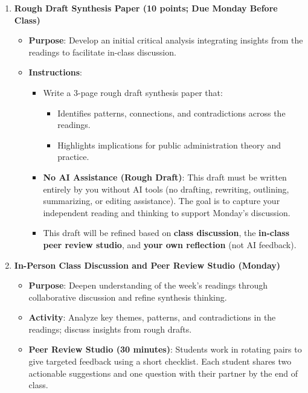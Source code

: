 \documentclass[11pt]{article}     %
\begin{document}
\begin{enumerate}
    \item \textbf{Rough Draft Synthesis Paper (10 points; Due Monday Before Class)}
    \begin{itemize}
        \item \textbf{Purpose}: Develop an initial critical analysis integrating insights from the readings to facilitate in-class discussion.
        \item \textbf{Instructions}:
        \begin{itemize}
            \item Write a 3-page rough draft synthesis paper that:
            \begin{itemize}
                \item Identifies patterns, connections, and contradictions across the readings.
                \item Highlights implications for public administration theory and practice.
            \end{itemize}
    
            \item \textbf{No AI Assistance (Rough Draft)}: This draft must be written entirely by you without AI tools (no drafting, rewriting, outlining, summarizing, or editing assistance). The goal is to capture your independent reading and thinking to support Monday’s discussion.
    
            \item This draft will be refined based on \textbf{class discussion}, the \textbf{in-class peer review studio}, and \textbf{your own reflection} (not AI feedback).
        \end{itemize}
    \end{itemize}

    \item \textbf{In-Person Class Discussion and Peer Review Studio (Monday)}
        \begin{itemize}
            \item \textbf{Purpose}: Deepen understanding of the week's readings through collaborative discussion and refine synthesis thinking.
            \item \textbf{Activity}: Analyze key themes, patterns, and contradictions in the readings; discuss insights from rough drafts.
            \item \textbf{Peer Review Studio (30 minutes)}: Students work in rotating pairs to give targeted feedback using a short checklist. Each student shares two actionable suggestions and one question with their partner by the end of class.
        \end{itemize}


\end{enumerate}
\end{document}
